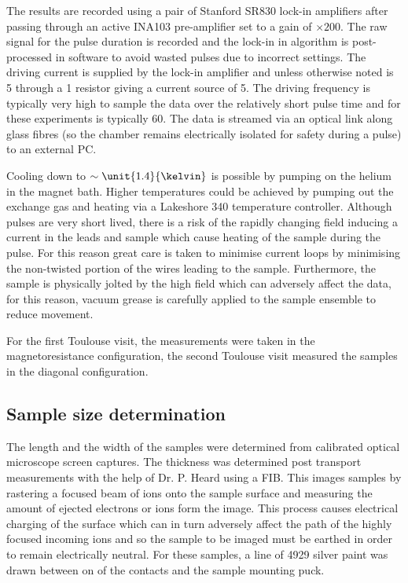 The results are recorded using a pair of Stanford SR830 lock-in amplifiers after passing through an active INA103 pre-amplifier set to a gain of $\times200$. The raw signal for the pulse duration is recorded and the lock-in in algorithm is post-processed in software to avoid wasted pulses due to incorrect settings. The driving current is supplied by the lock-in amplifier and unless otherwise noted is \unit{5}{\volt} through a \unit{1}{\kilo\ohm} resistor giving a current source of \unit{5}{\milli\ampere}. The driving frequency is typically very high to sample the data over the relatively short pulse time and for these experiments is typically \unit{60}{\kilo\hertz}. The data is streamed via an optical link along glass fibres (so the chamber remains electrically isolated for safety during a pulse) to an external PC.

Cooling down to $\sim \unit{1.4}{\kelvin}$ is possible by pumping on the helium in the magnet bath. Higher temperatures could be achieved by pumping out the exchange gas and heating via a Lakeshore 340 temperature controller. Although pulses are very short lived, there is a risk of the rapidly changing field inducing a current in the leads and sample which cause heating of the sample during the pulse. For this reason great care is taken to minimise current loops by minimising the non-twisted portion of the wires leading to the sample. Furthermore, the sample is physically jolted by the high field which can adversely affect the data, for this reason, vacuum grease is carefully applied to the sample ensemble to reduce movement.

For the first Toulouse visit, the measurements were taken in the magnetoresistance configuration, the second Toulouse visit measured the samples in the diagonal configuration.

\subsection{Sample size determination}

The length and the width of the samples were determined from calibrated optical microscope screen captures. The thickness was determined post transport measurements with the help of Dr. P. Heard using a \ac{FIB}. This images samples by rastering a focused beam of ions onto the sample surface and measuring the amount of ejected electrons or ions form the image. This process causes electrical charging of the surface which can in turn adversely affect the path of the highly focused incoming ions and so the sample to be imaged must be earthed in order to remain electrically neutral. For these samples, a line of 4929 silver paint was drawn between on of the contacts and the sample mounting puck.

